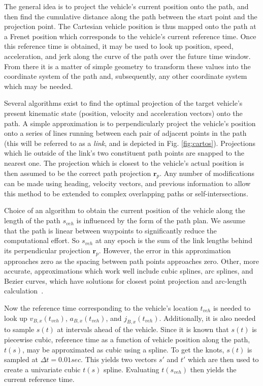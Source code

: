 \documentclass[letterpaper, 10 pt, conference]{ieeeconf}  %
\begin{document}
The general idea is to project the vehicle's current position onto the path, and then find the cumulative distance along the path between the start point and the projection point.
The Cartesian vehicle position is thus mapped onto the path at a Frenet position which corresponds to the vehicle's current reference time.
Once this reference time is obtained, it may be used to look up position, speed, acceleration, and jerk along the curve of the path over the future time window.
From there it is a matter of simple geometry to transform these values into the coordinate system of the path and, subsequently, any other coordinate system which may be needed.


Several algorithms exist to find the optimal projection of the target vehicle's present kinematic state (position, velocity and acceleration vectors) onto the path.
A simple approximation is to perpendicularly project the vehicle's position onto a series of lines running between each pair of adjacent points in the path (this will be referred to as a {\it link}, and is depicted in Fig. \ref{fig:cartos}).
Projections which lie outside of the link's two constituent path points are snapped to the nearest one.
The projection which is closest to the vehicle's actual position is then assumed to be the correct path projection $\mathbf{r}_p$.
Any number of modifications can be made using heading, velocity vectors, and previous information to allow this method to be extended to complex overlapping paths or self-intersections.

Choice of an algorithm to obtain the current position of the vehicle along the length of the path $s_{veh}$ is influenced by the form of the path plan.
We assume that the path is linear between waypoints to significantly reduce the computational effort.
So $s_{veh}$ at any epoch is the sum of the link lengths behind its perpendicular projection $\mathbf{r}_p$.
However, the error in this approximation approaches zero as the spacing between path points approaches zero.
Other, more accurate, approximations which work well include cubic splines, arc splines, and Bezier curves, which have solutions for closest point projection and arc-length calculation~\cite{Wang2002,Wang2003,Schindler2011}.

Now the reference time corresponding to the vehicle's location $t_{veh}$ is needed to look up $v_{B,x}(t_{veh})$, $a_{B,x}(t_{veh})$, and $j_{B,x}(t_{veh})$.
Additionally, it is also needed to sample $s(t)$ at intervals ahead of the vehicle.
Since it is known that $s(t)$ is piecewise cubic, reference time as a function of vehicle position along the path, $t(s)$, may be approximated as cubic using a spline.
To get the knots, $s(t)$ is sampled at $\Delta t = 0.01 sec$.
This yields two vectors $s'$ and $t'$ which are then used to create a univariate cubic $t(s)$ spline.
Evaluating $t(s_{veh})$ then yields the current reference time.
\end{document}

